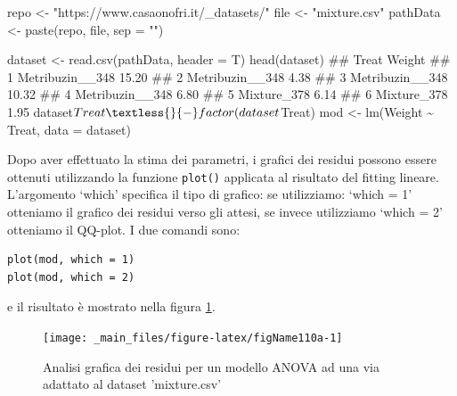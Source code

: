 \documentclass[a4paper,12pt,oneside]{book}
\newenvironment{Shaded}{\begin{snugshade}}{\end{snugshade}}
\newcommand{\SpecialCharTok}[1]{#1}
\newcommand{\StringTok}[1]{#1}
\newcommand{\DocumentationTok}[1]{#1}
\newcommand{\OtherTok}[1]{#1}
\newcommand{\FunctionTok}[1]{#1}
\newcommand{\AttributeTok}[1]{#1}
\newcommand{\NormalTok}[1]{#1}
\begin{document}
\begin{Shaded}
\begin{Highlighting}[]
\NormalTok{repo }\OtherTok{\textless{}{-}} \StringTok{"https://www.casaonofri.it/\_datasets/"}
\NormalTok{file }\OtherTok{\textless{}{-}} \StringTok{"mixture.csv"}
\NormalTok{pathData }\OtherTok{\textless{}{-}} \FunctionTok{paste}\NormalTok{(repo, file, }\AttributeTok{sep =} \StringTok{""}\NormalTok{)}

\NormalTok{dataset }\OtherTok{\textless{}{-}} \FunctionTok{read.csv}\NormalTok{(pathData, }\AttributeTok{header =}\NormalTok{ T)}
\FunctionTok{head}\NormalTok{(dataset)}
\DocumentationTok{\#\#             Treat Weight}
\DocumentationTok{\#\# 1 Metribuzin\_\_348  15.20}
\DocumentationTok{\#\# 2 Metribuzin\_\_348   4.38}
\DocumentationTok{\#\# 3 Metribuzin\_\_348  10.32}
\DocumentationTok{\#\# 4 Metribuzin\_\_348   6.80}
\DocumentationTok{\#\# 5     Mixture\_378   6.14}
\DocumentationTok{\#\# 6     Mixture\_378   1.95}
\NormalTok{dataset}\SpecialCharTok{$}\NormalTok{Treat }\OtherTok{\textless{}{-}} \FunctionTok{factor}\NormalTok{(dataset}\SpecialCharTok{$}\NormalTok{Treat)}
\NormalTok{mod }\OtherTok{\textless{}{-}} \FunctionTok{lm}\NormalTok{(Weight }\SpecialCharTok{\textasciitilde{}}\NormalTok{ Treat, }\AttributeTok{data =}\NormalTok{ dataset)}
\end{Highlighting}
\end{Shaded}

Dopo aver effettuato la stima dei parametri, i grafici dei residui possono essere ottenuti utilizzando la funzione \texttt{plot()} applicata al risultato del fitting lineare. L'argomento `which' specifica il tipo di grafico: se utilizziamo: `which = 1' otteniamo il grafico dei residui verso gli attesi, se invece utilizziamo `which = 2' otteniamo il QQ-plot. I due comandi sono:

\begin{verbatim}
plot(mod, which = 1)
plot(mod, which = 2)
\end{verbatim}

e il risultato è mostrato nella figura \ref{fig:figName110a}.

\begin{figure}

{\centering \texttt{[image: \_main\_files/figure-latex/figName110a-1]} 

}

\caption{Analisi grafica dei residui per un modello ANOVA ad una via adattato al dataset 'mixture.csv'}\label{fig:figName110a}
\end{figure}
\end{document}
